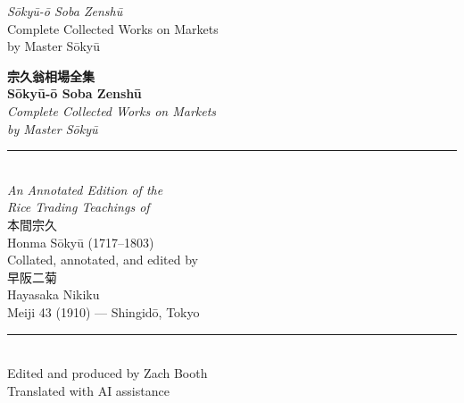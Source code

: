 \documentclass[10pt, openany]{book}
\newcommand{\jp}[1]{{\japanesefont #1}}
\begin{document}
\thispagestyle{empty}
\begin{center}
\vspace*{2.5in}
{\Large\itshape S\=oky\=u-\=o Soba Zensh\=u}\\[0.5em]
{\large Complete Collected Works on Markets\\by Master S\=oky\=u}
\vfill
\end{center}
\newpage\thispagestyle{empty}\mbox{}\newpage

\thispagestyle{empty}
\begin{center}
\vspace*{1in}
{\huge\bfseries\color{chaptercolor} \jp{宗久翁相場全集}}\\[1em]
{\LARGE\bfseries S\=oky\=u-\=o Soba Zensh\=u}\\[0.7em]
{\Large\itshape Complete Collected Works on Markets\\by Master S\=oky\=u}\\[2em]
\rule{3in}{0.5pt}\\[1.5em]
{\large\itshape An Annotated Edition of the\\Rice Trading Teachings of}\\[0.5em]
{\large \jp{本間宗久}}\\
{\normalsize Honma S\=oky\=u (1717--1803)}\\[1.5em]
{\normalsize Collated, annotated, and edited by}\\[0.3em]
{\large \jp{早阪二菊}}\\
{\normalsize Hayasaka Nikiku}\\[0.3em]
{\small Meiji 43 (1910) --- Shingid\=o, Tokyo}\\[2em]
\rule{3in}{0.5pt}\\[1.5em]
{\normalsize Edited and produced by Zach Booth}\\[0.3em]
{\small Translated with AI assistance}\\[3em]
\end{center}
\vfill
\newpage

\thispagestyle{empty}
~\vfill
\end{document}
